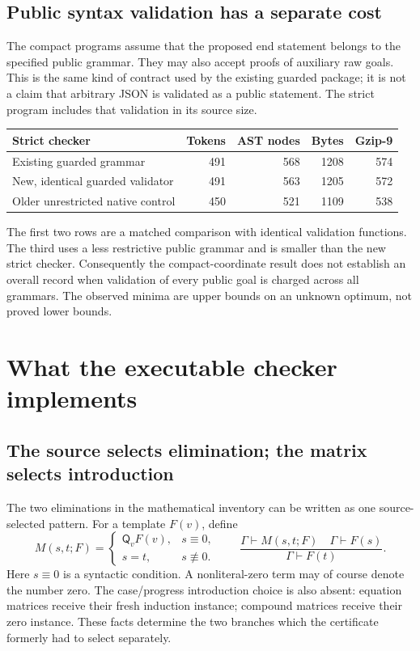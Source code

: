 \documentclass[11pt,letterpaper]{article}
\theoremstyle{definition}\newtheorem{definition}[theorem]{Definition}
\theoremstyle{remark}\newtheorem{remark}[theorem]{Remark}
\newcommand{\Q}{\mathsf Q}
\begin{document}
\subsection{Public syntax validation has a separate cost}

The compact programs assume that the proposed end statement belongs to the
specified public grammar. They may also accept proofs of auxiliary raw
goals. This is the same kind of contract used by the existing guarded
package; it is not a claim that arbitrary JSON is validated as a public
statement. The strict program includes that validation in its source size.

\begin{center}\small
\begin{tabular}{lrrrr}
\toprule
Strict checker & Tokens & AST nodes & Bytes & Gzip-9\\
\midrule
Existing guarded grammar &491&568&1208&574\\
New, identical guarded validator &491&563&1205&572\\
Older unrestricted native control &450&521&1109&538\\
\bottomrule
\end{tabular}
\end{center}
The first two rows are a matched comparison with identical validation
functions. The third uses a less restrictive public grammar and is smaller
than the new strict checker. Consequently the compact-coordinate result
does not establish an overall record when validation of every public goal
is charged across all grammars. The observed minima are upper bounds on
an unknown optimum, not proved lower bounds.



\section{What the executable checker implements}
\label{sec:implementation}

\subsection{The source selects elimination; the matrix selects introduction}

The two eliminations in the mathematical inventory can be written as one
source-selected pattern. For a template $F(v)$, define
\[
M(s,t;F)=
\begin{cases}
\Q_vF(v),&s\equiv0,\\
s=t,&s\not\equiv0.
\end{cases}
\qquad
\frac{\Gamma\vdash M(s,t;F)\quad\Gamma\vdash F(s)}
     {\Gamma\vdash F(t)}.
\]
Here $s\equiv0$ is a syntactic condition. A nonliteral-zero term may of
course denote the number zero. The case/progress introduction choice is
also absent: equation matrices receive their fresh induction instance;
compound matrices receive their zero instance. These facts determine the
two branches which the certificate formerly had to select separately.
\end{document}
